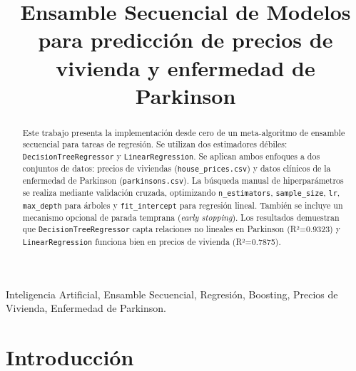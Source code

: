 \documentclass[conference,a4paper]{IEEEtran}
\begin{document}
\title{Ensamble Secuencial de Modelos para predicción de precios de vivienda y enfermedad de Parkinson}

\author{
  
  \and
  
}

\maketitle


\begin{abstract}
Este trabajo presenta la implementación desde cero de un meta-algoritmo de ensamble secuencial para tareas de regresión. Se utilizan dos estimadores débiles: \texttt{DecisionTreeRegressor} y \texttt{LinearRegression}. Se aplican ambos enfoques a dos conjuntos de datos: precios de viviendas (\texttt{house\_prices.csv}) y datos clínicos de la enfermedad de Parkinson (\texttt{parkinsons.csv}). La búsqueda manual de hiperparámetros se realiza mediante validación cruzada, optimizando \texttt{n\_estimators}, \texttt{sample\_size}, \texttt{lr}, \texttt{max\_depth} para árboles y \texttt{fit\_intercept} para regresión lineal. También se incluye un mecanismo opcional de parada temprana (\emph{early stopping}). Los resultados demuestran que \texttt{DecisionTreeRegressor} capta relaciones no lineales en Parkinson (R²=0.9323) y \texttt{LinearRegression} funciona bien en precios de vivienda (R²=0.7875).
\end{abstract}


\begin{IEEEkeywords}
  Inteligencia Artificial, Ensamble Secuencial, Regresión, Boosting, Precios de Vivienda, Enfermedad de Parkinson.
\end{IEEEkeywords}

\section{Introducción}
\end{document}
